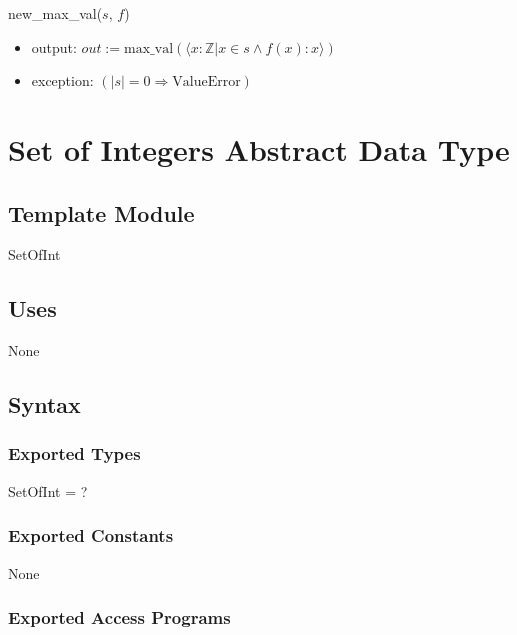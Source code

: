 \documentclass[12pt,fleqn]{examtst}
\begin{document}
\noindent new\_max\_val($s$, $f$)
\begin{itemize}
\item output: $\mathit{out} := \text{max\_val}(\langle x: \mathbb{Z} | x \in s
  \wedge f(x): x \rangle )$
\item exception: $(|s| = 0 \Rightarrow \text{ValueError})$
\end{itemize}


\newpage

\section* {Set of Integers Abstract Data Type}

\subsection* {Template Module}

SetOfInt

\subsection* {Uses}

None

\subsection* {Syntax}

\subsubsection* {Exported Types}

SetOfInt = ?

\subsubsection* {Exported Constants}

None

\subsubsection* {Exported Access Programs}
\end{document}
